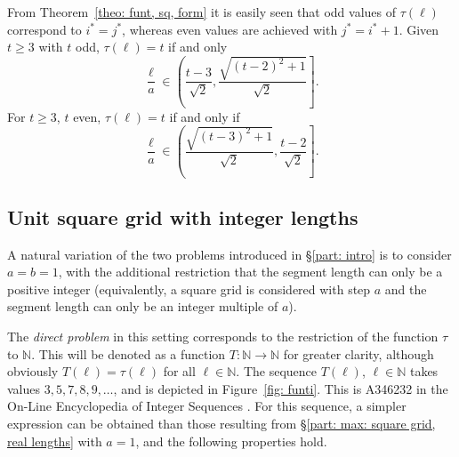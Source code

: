 \documentclass[12pt, a4paper]{article}
\newcommand{\funt}{\tau} %
\newcommand{\funti}{T} %
\newcommand{\len}{\ell} %
\newcommand{\leni}{\ell} %
\newcommand{\tiles}{t} %
\newcommand{\isoli}{i^\ast}
\newcommand{\jsoli}{j^\ast}
\begin{document}
From Theorem~\ref{theo: funt, sq, form} it is easily seen that odd values of $\funt(\len)$ correspond to $\isoli = \jsoli$, whereas even values are achieved with $\jsoli = \isoli+1$. Given $\tiles \geq 3$ with $t$ odd, $\funt(\len) = \tiles$ if and only
\begin{equation}
\label{eq: square, odd max tiles, lengths}
\frac \len a \in \left( \frac{\tiles-3}{\sqrt{2}}, \frac{ \sqrt{(\tiles-2)^2+1}}{\sqrt{2}} \right].
\end{equation}
For $\tiles \geq 3$, $t$ even, $\funt(\len) = \tiles$ if and only if
\begin{equation}
\label{eq: square, even max tiles, lengths}
\frac \len a \in \left(\frac{ \sqrt{(\tiles-3)^2+1}}{\sqrt{2}}, \frac{\tiles-2}{\sqrt{2}} \right].
\end{equation}


\subsection{Unit square grid with integer lengths}
\label{part: max: unit square grid, integer lengths}

A natural variation of the two problems introduced in \S\ref{part: intro} is to consider $a=b=1$, with the additional restriction that the segment length can only be a positive integer (equivalently, a square grid is considered with step $a$ and the segment length can only be an integer multiple of $a$).

The \emph{direct problem} in this setting corresponds to the restriction of the function $\funt$ to $\mathbb N$. This will be denoted as a function $\funti: \mathbb N \to \mathbb N$ for greater clarity, although obviously $\funti(\leni) = \funt(\leni)$ for all $\leni \in \mathbb N$. The sequence $\funti(\leni)$, $\leni \in \mathbb N$ takes values $3, 5, 7, 8, 9, \ldots$, and is depicted in Figure~\ref{fig: funti}. This is A346232 in the On-Line Encyclopedia of Integer Sequences \cite{OEIS_unitsq_int_dir}. For this sequence, a simpler expression can be obtained than those resulting from \S\ref{part: max: square grid, real lengths} with $a=1$, and the following properties hold.
\end{document}
